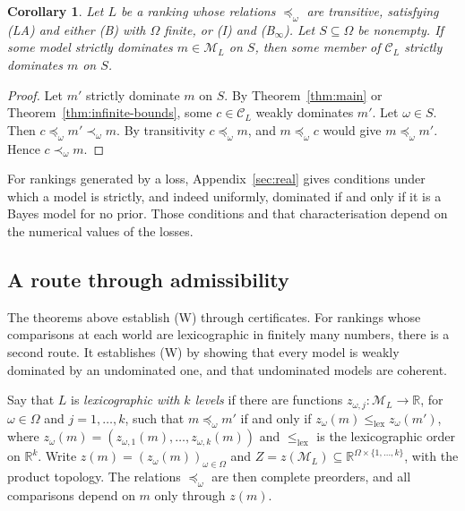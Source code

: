 \documentclass[11pt]{article}
\newtheorem{corollary}[theorem]{Corollary}
\theoremstyle{definition}
\theoremstyle{remark}
\newcommand{\R}{\mathbb R}
\newcommand{\M}{\mathcal M}
\newcommand{\C}{\mathcal C}
\begin{document}
\begin{corollary}\label{cor:strict-ordinal}
Let $L$ be a ranking whose relations $\preceq_\omega$ are transitive, satisfying (LA) and either (B) with $\Omega$ finite, or (I) and (B$_\infty$). Let $S\subseteq\Omega$ be nonempty. If some model strictly dominates $m\in\M_L$ on $S$, then some member of $\C_L$ strictly dominates $m$ on $S$.
\end{corollary}
\begin{proof}
Let $m'$ strictly dominate $m$ on $S$. By Theorem~\ref{thm:main} or Theorem~\ref{thm:infinite-bounds}, some $c\in\C_L$ weakly dominates $m'$. Let $\omega\in S$. Then $c\preceq_\omega m'\prec_\omega m$. By transitivity $c\preceq_\omega m$, and $m\preceq_\omega c$ would give $m\preceq_\omega m'$. Hence $c\prec_\omega m$.
\end{proof}
For rankings generated by a loss, Appendix~\ref{sec:real} gives conditions under which a model is strictly, and indeed uniformly, dominated if and only if it is a Bayes model for no prior. Those conditions and that characterisation depend on the numerical values of the losses.

\subsection{A route through admissibility}\label{sec:admissibility}
The theorems above establish (W) through certificates. For rankings whose comparisons at each world are lexicographic in finitely many numbers, there is a second route. It establishes (W) by showing that every model is weakly dominated by an undominated one, and that undominated models are coherent.

Say that $L$ is \emph{lexicographic with $k$ levels} if there are functions $z_{\omega,j}:\M_L\to\R$, for $\omega\in\Omega$ and $j=1,\dots,k$, such that $m\preceq_\omega m'$ if and only if $z_\omega(m)\le_{\mathrm{lex}}z_\omega(m')$, where $z_\omega(m)=(z_{\omega,1}(m),\dots,z_{\omega,k}(m))$ and $\le_{\mathrm{lex}}$ is the lexicographic order on $\R^k$. Write $z(m)=(z_\omega(m))_{\omega\in\Omega}$ and $Z=z(\M_L)\subseteq\R^{\Omega\times\{1,\dots,k\}}$, with the product topology. The relations $\preceq_\omega$ are then complete preorders, and all comparisons depend on $m$ only through $z(m)$.
\end{document}
